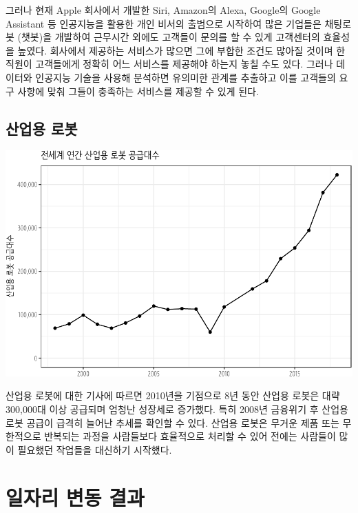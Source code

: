 \documentclass[smallextended]{svjour3}       %
\begin{document}
그러나 현재 Apple 회사에서 개발한 Siri, Amazon의 Alexa, Google의 Google
Assistant 등 인공지능을 활용한 개인 비서의 출범으로 시작하여 많은
기업들은 채팅로봇 (챗봇)을 개발하여 근무시간 외에도 고객들이 문의를 할
수 있게 고객센터의 효율성을 높였다. 회사에서 제공하는 서비스가 많으면
그에 부합한 조건도 많아질 것이며 한 직원이 고객들에게 정확히 어느
서비스를 제공해야 하는지 놓칠 수도 있다. 그러나 데이터와 인공지능 기술을
사용해 분석하면 유의미한 관계를 추출하고 이를 고객들의 요구 사항에 맞춰
그들이 충족하는 서비스를 제공할 수 있게 된다.

\hypertarget{industrial-robot}{%
\subsection{산업용 로봇}\label{industrial-robot}}

\begin{center}\includegraphics[width=1\linewidth]{paper_files/figure-latex/industrial-robot-1} \end{center}

산업용 로봇에 대한 기사\cite{ahlstrom_2019}에 따르면 2010년을 기점으로
8년 동안 산업용 로봇은 대략 300,000대 이상 공급되며 엄청난 성장세로
증가했다. 특히 2008년 금융위기 후 산업용 로봇 공급이 급격히 늘어난
추세를 확인할 수 있다. 산업용 로봇은 무거운 제품 또는 무한적으로
반복되는 과정을 사람들보다 효율적으로 처리할 수 있어 전에는 사람들이
많이 필요했던 작업들을 대신하기 시작했다.

\hypertarget{automation-result}{%
\section{일자리 변동 결과}\label{automation-result}}
\end{document}
